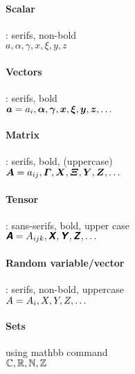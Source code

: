 \documentclass{article}
\begin{document}
	\paragraph{Scalar}: serifs, non-bold \\
	$a, \alpha, \gamma, x, \xi, y, z $
	\paragraph{Vectors}: serifs, bold \\
	$\bm{a} = a_i, \bm{\alpha}, \bm{\gamma},  \bm{x}, \bm{\xi}, \bm{y}, \bm{z}, \dots$
	
	\paragraph{Matrix}: serifs, bold, (uppercase) \\
	$\bm{A} = a_{ij} , \bm{\varGamma},  \bm{X}, \bm{\varXi}, \bm{Y}, \bm{Z}, \dots$
		
	\paragraph{Tensor}: sans-serifs, bold, upper case \\
	$\textsf{\textbf{\textsl{A}}} = A_{ijk}, \textsf{\textbf{\textsl{X}}}, \textsf{\textbf{\textsl{Y}}}, \textsf{\textbf{\textsl{Z}}}, \dots $	
	
	\paragraph{Random variable/vector}: serifs, non-bold, uppercase \\
	$A = A_{i}, X, Y, Z, \dots $			
	
	\paragraph{Sets} using mathbb command\\
	$ \mathbb{C}, \mathbb{R}, \mathbb{N}, \mathbb{Z} $	
	
\end{document}
